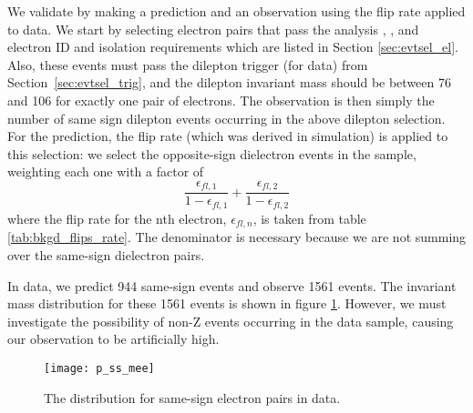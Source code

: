 We validate by making a prediction and an observation using the flip rate
applied to data. We start by selecting electron pairs that pass the analysis
\pt, \aeta, and electron ID and isolation requirements which are listed
in Section \ref{sec:evtsel_el}. Also, these events must pass the dilepton
trigger (for data) from Section~\ref{sec:evtsel_trig}, and the dilepton
invariant mass should be between 76 \GeV and 106 \GeV for exactly one pair of
electrons. The observation is then simply the number of same sign dilepton
events occurring in the above dilepton selection. For the prediction, the flip
rate (which was derived in simulation) is applied to this selection: we select the
opposite-sign dielectron events in the sample, weighting each one with a factor
of
\[ 
\frac{\epsilon_{fl,1}}{1 - \epsilon_{fl,1}} + \frac{\epsilon_{fl,2}}{1 - \epsilon_{fl,2}}
\]
where the flip rate for the nth electron, $\epsilon_{fl, n}$, is taken from
table \ref{tab:bkgd_flips_rate}. The denominator is necessary because we are
not summing over the same-sign dielectron pairs.
 
In data, we predict 944 same-sign events and observe 1561 events. The
invariant mass distribution for these 1561 events is shown in figure
\ref{fig:bkgd_flips_ss_mee}. However, we must investigate the possibility of
non-Z events occurring in the data sample, causing our observation to be
artificially high.
\begin{figure}[!hbt]
\begin{center}
\texttt{[image: p\_ss\_mee]}
\caption[The \mee distribution for same-sign electron pairs in data]
{\label{fig:bkgd_flips_ss_mee}
The \mee distribution for same-sign electron pairs in data.
}
\end{center}
\end{figure}


